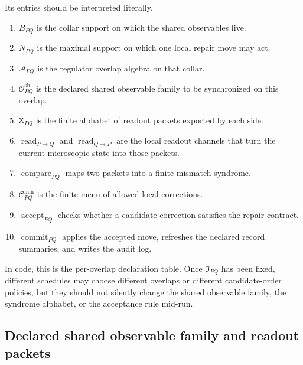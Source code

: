 \documentclass[11pt]{article}
\begin{document}
Its entries should be interpreted literally.
\begin{enumerate}[leftmargin=2em]
\item $B_{PQ}$ is the collar support on which the shared observables live.
\item $N_{PQ}$ is the maximal support on which one local repair move may act.
\item $\mathcal A_{PQ}$ is the regulator overlap algebra on that collar.
\item $\mathcal O^{\mathrm{sh}}_{PQ}$ is the declared shared observable family to be
synchronized on this overlap.
\item $\mathsf X_{PQ}$ is the finite alphabet of readout packets exported by each side.
\item $\operatorname{read}_{P\to Q}$ and $\operatorname{read}_{Q\to P}$ are the local readout
channels that turn the current microscopic state into those packets.
\item $\operatorname{compare}_{PQ}$ maps two packets into a finite mismatch syndrome.
\item $\mathcal C^{\mathrm{min}}_{PQ}$ is the finite menu of allowed local corrections.
\item $\operatorname{accept}_{PQ}$ checks whether a candidate correction satisfies the repair
contract.
\item $\operatorname{commit}_{PQ}$ applies the accepted move, refreshes the declared record
summaries, and writes the audit log.
\end{enumerate}

In code, this is the per-overlap declaration table. Once $\mathfrak I_{PQ}$ has been fixed,
different schedules may choose different overlaps or different candidate-order policies, but they
should not silently change the shared observable family, the syndrome alphabet, or the
acceptance rule mid-run.

\subsection{Declared shared observable family and readout packets}
\end{document}
